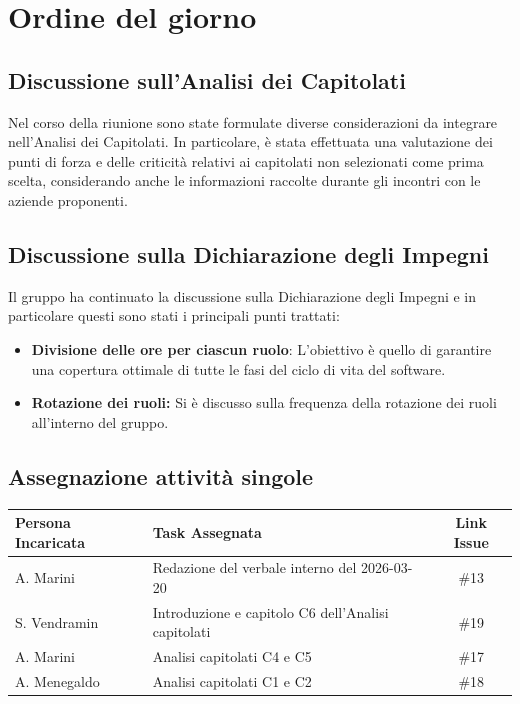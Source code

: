 \documentclass[a4paper, 10pt, colorlinks=true, linkcolor=black, urlcolor=blue, citecolor=blue, hidelinks]{article}
\begin{document}
\section{Ordine del giorno}
\subsection{Discussione sull'Analisi dei Capitolati}
Nel corso della riunione sono state formulate diverse considerazioni da integrare nell'Analisi dei Capitolati. In particolare, è stata effettuata una valutazione dei punti di forza e delle criticità relativi ai capitolati non selezionati come prima scelta, considerando anche le informazioni raccolte durante gli incontri con le aziende proponenti.

\subsection{Discussione sulla Dichiarazione degli Impegni}
Il gruppo ha continuato la discussione sulla Dichiarazione degli Impegni e in particolare questi sono stati i principali punti trattati:
\begin{itemize}
    \item \textbf{Divisione delle ore per ciascun ruolo}: L'obiettivo è quello di garantire una copertura ottimale di tutte le fasi del ciclo di vita del software.
    \item \textbf{Rotazione dei ruoli:} Si è discusso sulla frequenza della rotazione dei ruoli all'interno del gruppo.
\end{itemize}

\subsection{Assegnazione attività singole}
\begin{center}
\renewcommand{\arraystretch}{1.4}
\begin{tabular}{|l|p{8cm}|c|}
\hline
\textbf{Persona Incaricata} & \textbf{Task Assegnata} & \textbf{Link Issue} \\ \hline
A. Marini & Redazione del verbale interno del 2026-03-20 & \#13 \\ \hline
S. Vendramin & Introduzione e capitolo C6 dell'Analisi capitolati & \#19 \\ \hline
A. Marini & Analisi capitolati C4 e C5 & \#17 \\ \hline
A. Menegaldo & Analisi capitolati C1 e C2 & \#18 \\ \hline
\end{tabular}
\end{center}


\appendix
\end{document}
